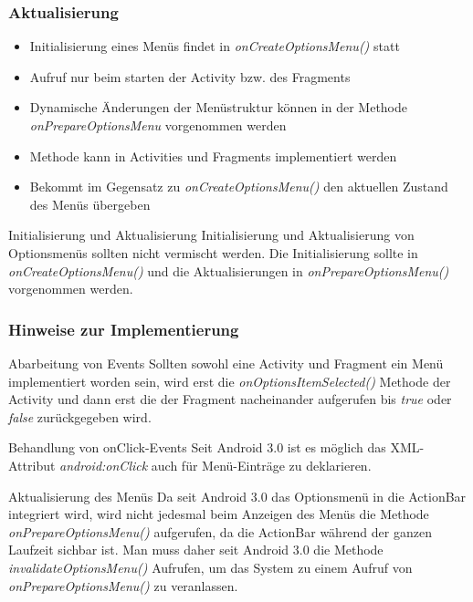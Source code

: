 \begin{frame}
   \frametitle{Aktualisierung}
   \begin{itemize}
      \item Initialisierung eines Menüs findet in \emph{onCreateOptionsMenu()} statt
      \item Aufruf nur beim starten der Activity bzw. des Fragments
      \item Dynamische Änderungen der Menüstruktur können in der Methode 
         \emph{onPrepareOptionsMenu} vorgenommen werden
      \item Methode kann in Activities und Fragments implementiert werden
      \item Bekommt im Gegensatz zu \emph{onCreateOptionsMenu()} den 
         aktuellen Zustand des Menüs übergeben
   \end{itemize}

   \begin{alertblock}{Initialisierung und Aktualisierung}
      Initialisierung und Aktualisierung von Optionsmenüs sollten nicht vermischt 
      werden. Die Initialisierung sollte in \emph{onCreateOptionsMenu()} und die 
      Aktualisierungen in \emph{onPrepareOptionsMenu()} vorgenommen werden.
   \end{alertblock}
\end{frame}

\begin{frame}
   \frametitle{Hinweise zur Implementierung}

   \begin{alertblock}{Abarbeitung von Events}
      Sollten sowohl eine Activity und Fragment ein Menü implementiert worden sein, 
      wird erst die \emph{onOptionsItemSelected()} Methode der Activity und dann erst 
      die der Fragment nacheinander aufgerufen bis \emph{true} oder \emph{false} 
      zurückgegeben wird.
   \end{alertblock}
   
   \begin{alertblock}{Behandlung von onClick-Events}
      Seit Android 3.0 ist es möglich das XML-Attribut \emph{android:onClick} 
      auch für Menü-Einträge zu deklarieren.
   \end{alertblock}
   
   \begin{alertblock}{Aktualisierung des Menüs}
      Da seit Android 3.0 das Optionsmenü in die ActionBar integriert wird, 
      wird nicht jedesmal beim Anzeigen des Menüs die Methode \emph{onPrepareOptionsMenu()} 
      aufgerufen, da die ActionBar während der ganzen Laufzeit sichbar ist. 
      Man muss daher seit Android 3.0 die Methode \emph{invalidateOptionsMenu()} 
      Aufrufen, um das System zu einem Aufruf von \emph{onPrepareOptionsMenu()} zu veranlassen.
   \end{alertblock}
\end{frame}


